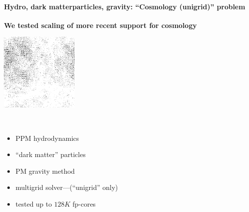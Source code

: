 
\begin{frame}[fragile]
 \secframetitle{\ssScaling}
\framesubtitle{Hydro, dark matterparticles, gravity: ``Cosmology (unigrid)'' problem}

\textbf{We tested scaling of more recent support for cosmology}

\begin{minipage}{1.5in}
  \vspace{0.2in}
  \includegraphics[width=1.5in]{Images/Cosmo/dark-20-normal.png} \\
\end{minipage} \
\begin{minipage}{2.75in}
  \vspace {0.2in}
  \begin{itemize}
  \item PPM hydrodynamics
  \item ``dark matter'' particles
  \item PM gravity method
  \item multigrid solver---(``unigrid'' only)
   \item tested up to $128K$ fp-cores
  \end{itemize}
\end{minipage}
\end{frame}
